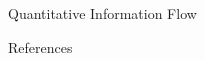 \documentclass[final]{beamer}
\newlength{\sepwidth}
\newlength{\colwidth}
\newcommand{\separatorcolumn}{\begin{column}{\sepwidth}\end{column}}
\begin{document}
\begin{frame}[t]
\begin{columns}[t]
\begin{column}{\colwidth}
\begin{block}{Quantitative Information Flow}
  \end{block}

  \begin{block}{References}

    \nocite{*}
    \footnotesize{}

  \end{block}

\end{column}

\separatorcolumn
\end{columns}
\end{frame}
\end{document}
